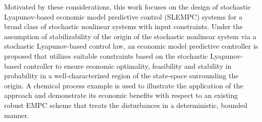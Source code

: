 \documentclass[letterpaper, 10pt, conference]{ieeeconf}
\begin{document}
	
	Motivated by these considerations,  this work focuses on the design of
	stochastic Lyapunov-based economic model
	predictive control (SLEMPC) systems for a broad class of
	stochastic nonlinear systems with input constraints. Under the assumption
	of stabilizability of the origin of the stochastic nonlinear system via a
	stochastic Lyapunov-based control law, an economic model predictive
	controller is proposed that utilizes suitable constraints based on the
	stochastic Lyapunov-based controller to ensure economic optimality,
	feasibility and stability in probability in a well-characterized region of
	the state-space surrounding the origin. A chemical process example is used
	to illustrate the application of the approach and demonstrate its economic
	benefits with respect to an existing robust EMPC scheme that treats the
	disturbances in a deterministic, bounded manner.
%	
\end{document}
